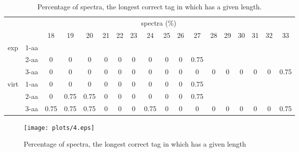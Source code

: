 \documentclass{article}
\begin{document}
\begin{landscape}
\begin{table}[h]\tiny
\vspace{3mm}
{\centering
\begin{center}
\begin{tabular}{|c|l|c|c|c|c|c|c|c|c|c|c|c|c|c|c|c|c|}
  \hline
  \multicolumn{2}{|c|}{ } & \multicolumn{ 15 }{|c|}{ spectra (\%)} \\
  \cline{3- 18}
  \multicolumn{2}{|c|}{ }  & 18 & 19 & 20 & 21 & 22 & 23 & 24 & 25 & 26 & 27 & 28 & 29 & 30 & 31 & 32 & 33\\
  \hline
  \multirow{3}{*}{exp}
&  1-aa  &  &  &  &  &  &  &  &  &  &  &  &  &  &  &  & \\
&  2-aa  & 0 & 0 & 0 & 0 & 0 & 0 & 0 & 0 & 0 & 0.75 &  &  &  &  &  & \\
&  3-aa  & 0 & 0 & 0 & 0 & 0 & 0 & 0 & 0 & 0 & 0 & 0 & 0 & 0 & 0 & 0 & 0.75\\
 \hline
  \multirow{3}{*}{virt} 
&  1-aa  & 0 & 0 & 0 & 0 & 0 & 0 & 0 & 0 & 0 & 0.75 &  &  &  &  &  & \\
&  2-aa  & 0 & 0.75 & 0.75 & 0 & 0 & 0 & 0 & 0 & 0 & 0.75 &  &  &  &  &  & \\
&  3-aa  & 0.75 & 0.75 & 0.75 & 0 & 0 & 0 & 0.75 & 0 & 0 & 0 & 0 & 0 & 0 & 0 & 0 & 0.75\\
 \hline
\end{tabular}
\end{center}
\par}
\centering
\caption{ Percentage of spectra, the longest correct tag in which has a given length.}
\label{table:table4}
\vspace{3mm}
\end{table}

\end{landscape}

\begin{figure}
  \begin{center}
\texttt{[image: plots/4.eps]}

\end{center}
\caption{Percentage of spectra, the longest correct tag in which has a given length}
  \label{fig:LABEL}
\end{figure}
\end{document}
